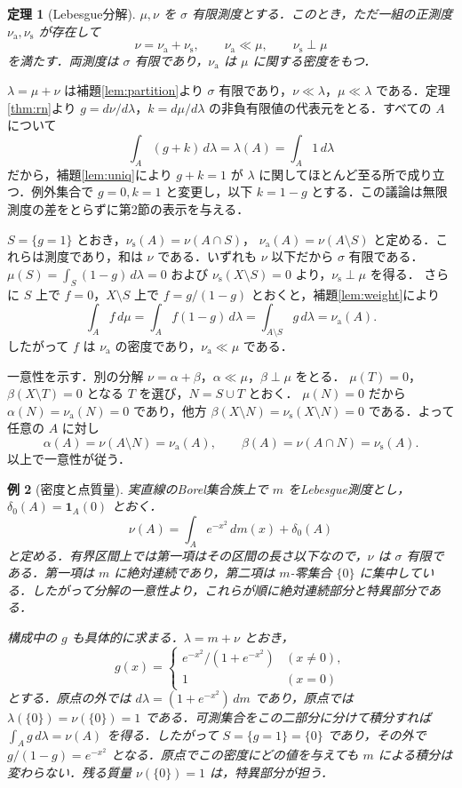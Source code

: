 \documentclass[a5paper,10pt,onecolumn]{jsarticle}
\makeatletter
\theoremstyle{mathnotetheorem}
\newtheorem{theorem}{定理}[section]
\newtheorem{example}[theorem]{例}
\renewcommand{\proofname}{証明}
\renewenvironment{proof}[1][\proofname]{%
  \par\pushQED{\qed}\normalfont\topsep4\p@\@plus2\p@\relax
  \trivlist\item[\hskip\labelsep\bfseries #1]\ignorespaces
}{\popQED\endtrivlist\@endpefalse}
\makeatother
\begin{document}
\begin{theorem}[Lebesgue分解]
$\mu,\nu$ を $\sigma$ 有限測度とする．このとき，ただ一組の正測度 $\nu_{\mathrm a},\nu_{\mathrm s}$ が存在して
\[
       \nu=\nu_{\mathrm a}+\nu_{\mathrm s},\qquad
       \nu_{\mathrm a}\ll\mu,\qquad \nu_{\mathrm s}\perp\mu
\]
を満たす．両測度は $\sigma$ 有限であり，$\nu_{\mathrm a}$ は $\mu$ に関する密度をもつ．
\end{theorem}
\begin{proof}
$\lambda=\mu+\nu$ は補題\ref{lem:partition}より $\sigma$ 有限であり，$\nu\ll\lambda$，$\mu\ll\lambda$ である．定理\ref{thm:rn}より $g=d\nu/d\lambda$，$k=d\mu/d\lambda$ の非負有限値の代表元をとる．すべての $A$ について
\[
            \int_A(g+k)\,d\lambda=\lambda(A)=\int_A1\,d\lambda
\]
だから，補題\ref{lem:uniq}により $g+k=1$ が $\lambda$ に関してほとんど至る所で成り立つ．例外集合で $g=0,k=1$ と変更し，以下 $k=1-g$ とする．この議論は無限測度の差をとらずに第2節の表示を与える．

$S=\{g=1\}$ とおき，$\nu_{\mathrm s}(A)=\nu(A\cap S)$，
$\nu_{\mathrm a}(A)=\nu(A\setminus S)$ と定める．これらは測度であり，和は $\nu$ である．いずれも $\nu$ 以下だから $\sigma$ 有限である．
$\mu(S)=\int_S(1-g)\,d\lambda=0$ および $\nu_{\mathrm s}(X\setminus S)=0$ より，$\nu_{\mathrm s}\perp\mu$ を得る．
さらに $S$ 上で $f=0$，$X\setminus S$ 上で $f=g/(1-g)$ とおくと，補題\ref{lem:weight}により
\[
      \int_A f\,d\mu=\int_A f(1-g)\,d\lambda
        =\int_{A\setminus S}g\,d\lambda=\nu_{\mathrm a}(A).
\]
したがって $f$ は $\nu_{\mathrm a}$ の密度であり，$\nu_{\mathrm a}\ll\mu$ である．

一意性を示す．別の分解 $\nu=\alpha+\beta$，$\alpha\ll\mu$，$\beta\perp\mu$ をとる．
$\mu(T)=0$，$\beta(X\setminus T)=0$ となる $T$ を選び，$N=S\cup T$ とおく．
$\mu(N)=0$ だから $\alpha(N)=\nu_{\mathrm a}(N)=0$ であり，他方 $\beta(X\setminus N)=\nu_{\mathrm s}(X\setminus N)=0$ である．よって任意の $A$ に対し
\[
 \alpha(A)=\nu(A\setminus N)=\nu_{\mathrm a}(A),\qquad
 \beta(A)=\nu(A\cap N)=\nu_{\mathrm s}(A).
\]
以上で一意性が従う．
\end{proof}

\begin{example}[密度と点質量]
実直線のBorel集合族上で $m$ をLebesgue測度とし，$\delta_0(A)=\mathbf1_A(0)$ とおく．
\[
            \nu(A)=\int_A e^{-x^2}\,dm(x)+\delta_0(A)
\]
と定める．有界区間上では第一項はその区間の長さ以下なので，$\nu$ は $\sigma$ 有限である．第一項は $m$ に絶対連続であり，第二項は $m$-零集合 $\{0\}$ に集中している．したがって分解の一意性より，これらが順に絶対連続部分と特異部分である．

構成中の $g$ も具体的に求まる．$\lambda=m+\nu$ とおき，
\[
  g(x)=\begin{cases}
  e^{-x^2}/(1+e^{-x^2}) & (x\ne0),\\
  1 & (x=0)
  \end{cases}
\]
とする．原点の外では $d\lambda=(1+e^{-x^2})\,dm$ であり，原点では $\lambda(\{0\})=\nu(\{0\})=1$ である．可測集合をこの二部分に分けて積分すれば $\int_A g\,d\lambda=\nu(A)$ を得る．したがって $S=\{g=1\}=\{0\}$ であり，その外で $g/(1-g)=e^{-x^2}$ となる．原点でこの密度にどの値を与えても $m$ による積分は変わらない．残る質量 $\nu(\{0\})=1$ は，特異部分が担う．
\end{example}
\end{document}
